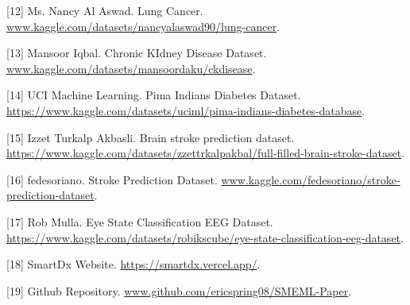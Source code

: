 \documentclass{article}
\begin{document}
{[12] Ms. Nancy Al Aswad. Lung Cancer. \url{www.kaggle.com/datasets/nancyalaswad90/lung-cancer}.

[13] Mansoor Iqbal. Chronic KIdney Disease Dataset. \url{www.kaggle.com/datasets/mansoordaku/ckdisease}.

[14] UCI Machine Learning. Pima Indians Diabetes Dataset. \url{https://www.kaggle.com/datasets/uciml/pima-indians-diabetes-database}.

[15] Izzet Turkalp Akbasli. Brain stroke prediction dataset. \url{https://www.kaggle.com/datasets/zzettrkalpakbal/full-filled-brain-stroke-dataset}.

[16] fedesoriano. Stroke Prediction Dataset. \url{www.kaggle.com/fedesoriano/stroke-prediction-dataset}.

[17] Rob Mulla. Eye State Classification EEG Dataset. \url{https://www.kaggle.com/datasets/robikscube/eye-state-classification-eeg-dataset}.

[18] SmartDx Website. \url{https://smartdx.vercel.app/}.

[19] Github Repository. \url{www.github.com/ericspring08/SMEML-Paper}.
}
\end{document}

